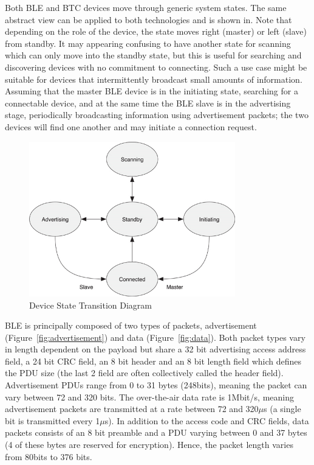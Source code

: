 \documentclass[]{article}
\begin{document}
Both BLE and BTC devices move through generic system states. The same abstract view can be applied to both technologies and is shown in. Note that depending on the role of the device, the state moves right (master) or left (slave) from standby. It may appearing confusing to have another state for scanning which can only move into the standby state, but this is useful for searching and discovering devices with no commitment to connecting. Such a use case might be suitable for devices that intermittently broadcast small amounts of information. Assuming that the master BLE device is in the initiating state, searching for a connectable device, and at the same time the BLE slave is in the advertising stage, periodically broadcasting information using advertisement packets; the two devices will find one another and may initiate a connection request.

\begin{figure}[htb]
	\begin{center}
		\includegraphics[width = 0.8\textwidth]{systemstate}
	\end{center}
	\caption{Device State Transition Diagram}
	\label{fig:systemstate}
\end{figure}

\ac{BLE} is principally composed of two types of packets, advertisement (Figure~\ref{fig:advertisement}) and data (Figure~\ref{fig:data}). Both packet types vary in length dependent on the payload but share a 32 bit advertising access address field, a 24 bit \ac{CRC} field, an 8 bit header and an 8 bit length field which defines the \ac{PDU} size (the last 2 field are often collectively called the header field). Advertisement \ac{PDU}s range from 0 to 31 bytes (248bits), meaning the packet can vary between 72 and 320 bits. The over-the-air data rate is 1Mbit/s, meaning advertisement packets are transmitted at a rate between 72 and 320$\mu$s (a single bit is transmitted every 1$\mu$s). In addition to the access code and \ac{CRC} fields, data packets consists of an 8 bit preamble and a \ac{PDU} varying between 0 and 37 bytes (4 of these bytes are reserved for encryption). Hence, the packet length varies from 80bits to 376 bits. 
\end{document}
